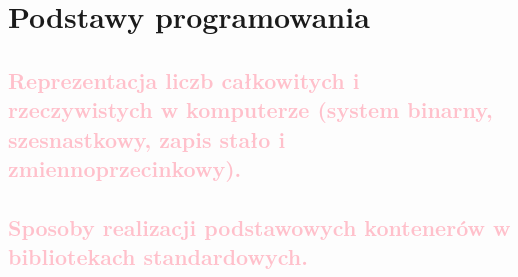 \chapter{Podstawy programowania}

\section{\textcolor{pink}{Reprezentacja liczb całkowitych i rzeczywistych w komputerze (system binarny, szesnastkowy, zapis stało i zmiennoprzecinkowy).}}

\section{\textcolor{pink}{Sposoby realizacji podstawowych kontenerów w bibliotekach standardowych.}}